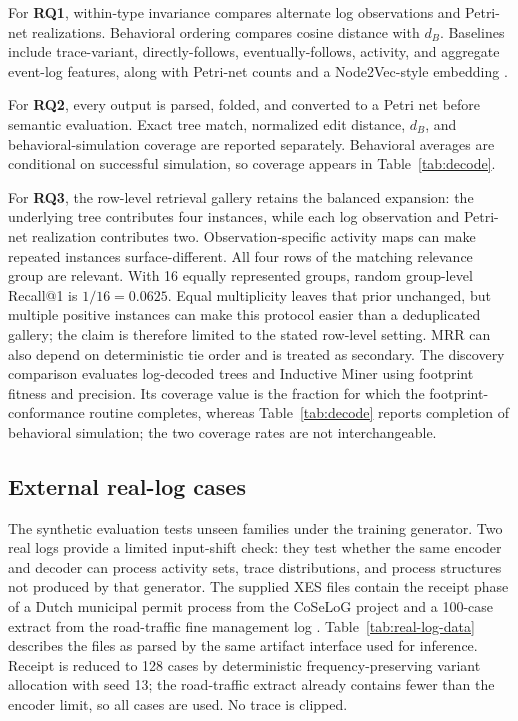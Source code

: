 \documentclass[pdflatex,sn-basic]{sn-jnl}
\newcommand{\RQone}{\textbf{RQ1}}
\newcommand{\RQtwo}{\textbf{RQ2}}
\newcommand{\RQthree}{\textbf{RQ3}}
\begin{document}
For \RQone, within-type invariance compares alternate log observations and Petri-net realizations. Behavioral ordering compares cosine distance with $d_B$. Baselines include trace-variant, directly-follows, eventually-follows, activity, and aggregate event-log features, along with Petri-net counts and a Node2Vec-style embedding \citep{Grover2016}.

For \RQtwo, every output is parsed, folded, and converted to a Petri net before semantic evaluation. Exact tree match, normalized edit distance, $d_B$, and behavioral-simulation coverage are reported separately. Behavioral averages are conditional on successful simulation, so coverage appears in Table~\ref{tab:decode}.

For \RQthree, the row-level retrieval gallery retains the balanced expansion: the underlying tree contributes four instances, while each log observation and Petri-net realization contributes two. Observation-specific activity maps can make repeated instances surface-different. All four rows of the matching relevance group are relevant. With 16 equally represented groups, random group-level Recall@1 is $1/16=0.0625$. Equal multiplicity leaves that prior unchanged, but multiple positive instances can make this protocol easier than a deduplicated gallery; the claim is therefore limited to the stated row-level setting. MRR can also depend on deterministic tie order and is treated as secondary. The discovery comparison evaluates log-decoded trees and Inductive Miner using footprint fitness and precision. Its coverage value is the fraction for which the footprint-conformance routine completes, whereas Table~\ref{tab:decode} reports completion of behavioral simulation; the two coverage rates are not interchangeable.

\subsection{External real-log cases}\label{sec:real-log-design}

The synthetic evaluation tests unseen families under the training generator. Two real logs provide a limited input-shift check: they test whether the same encoder and decoder can process activity sets, trace distributions, and process structures not produced by that generator. The supplied XES files contain the receipt phase of a Dutch municipal permit process from the CoSeLoG project \citep{Buijs2014Receipt} and a 100-case extract from the road-traffic fine management log \citep{DeLeoni2015RoadTraffic}. Table~\ref{tab:real-log-data} describes the files as parsed by the same artifact interface used for inference. Receipt is reduced to 128 cases by deterministic frequency-preserving variant allocation with seed 13; the road-traffic extract already contains fewer than the encoder limit, so all cases are used. No trace is clipped.
\end{document}
